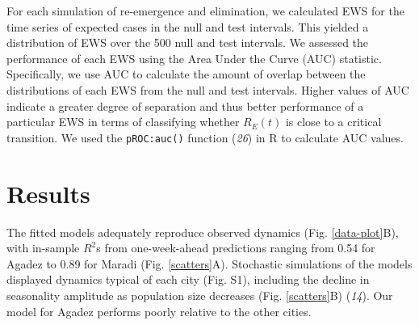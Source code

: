 \documentclass[3p]{elsarticle} %
\begin{document}
For each simulation of re-emergence and elimination, we calculated EWS
for the time series of expected cases in the null and test intervals.
This yielded a distribution of EWS over the 500 null and test intervals.
We assessed the performance of each EWS using the Area Under the Curve
(AUC) statistic. Specifically, we use AUC to calculate the amount of
overlap between the distributions of each EWS from the null and test
intervals. Higher values of AUC indicate a greater degree of separation
and thus better performance of a particular EWS in terms of classifying
whether \(R_E(t)\) is close to a critical transition. We used the
\texttt{pROC:auc()} function (\emph{26}) in R to calculate AUC values.

\section{Results}\label{results}

The fitted models adequately reproduce observed dynamics (Fig.
\ref{data-plot}B), with in-sample \(R^2\)s from one-week-ahead
predictions ranging from 0.54 for Agadez to 0.89 for Maradi (Fig.
\ref{scatters}A). Stochastic simulations of the models displayed
dynamics typical of each city (Fig. S1), including the decline in
seasonality amplitude as population size decreases (Fig.
\ref{scatters}B) (\emph{14}). Our model for Agadez performs poorly
relative to the other cities.
\end{document}
